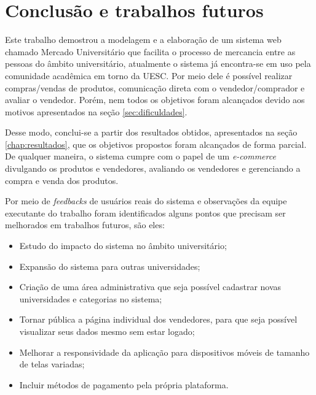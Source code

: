 \chapter{Conclusão e trabalhos futuros}
\label{chap:conclusoes_trabalhos_futuros}

Este trabalho demostrou a modelagem e a elaboração de um sistema web chamado Mercado Universitário que facilita o processo de mercancia entre as pessoas do âmbito universitário, atualmente o sistema já encontra-se em uso pela comunidade acadêmica em torno da UESC. Por meio dele é possível realizar compras/vendas de produtos, comunicação direta com o vendedor/comprador e avaliar o vendedor. Porém, nem todos os objetivos foram alcançados devido aos motivos apresentados na seção \ref{sec:dificuldades}.

Desse modo, conclui-se a partir dos resultados obtidos, apresentados na seção \ref{chap:resultados}, que os objetivos propostos foram alcançados de forma parcial. De qualquer maneira, o sistema cumpre com o papel de um \textit{e-commerce} divulgando os produtos e vendedores, avaliando os vendedores e gerenciando a compra e venda dos produtos.

Por meio de \textit{feedbacks} de usuários reais do sistema e observações da equipe executante do trabalho foram identificados alguns pontos que precisam ser melhorados em trabalhos futuros, são eles:

\begin{itemize}
    \item Estudo do impacto do sistema no âmbito universitário;
    \item Expansão do sistema para outras universidades;
    \item Criação de uma área administrativa que seja possível cadastrar novas universidades e categorias no sistema;
    \item Tornar pública a página individual dos vendedores, para que seja possível visualizar seus dados mesmo sem estar logado;
    \item Melhorar a responsividade da aplicação para dispositivos móveis de tamanho de telas variadas;
    \item Incluir métodos de pagamento pela própria plataforma.
 \end{itemize}


